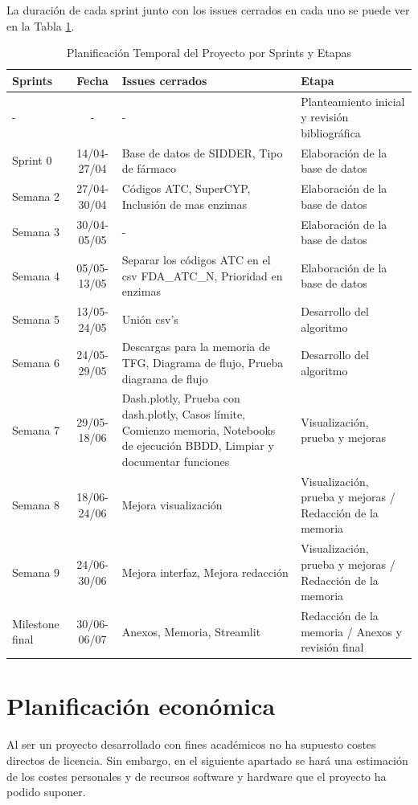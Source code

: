 La duración de cada sprint junto con los issues cerrados en cada uno se puede ver en la Tabla \ref{tab:milestones}.
\begin{table}[htbp]
\centering
\caption{Planificación Temporal del Proyecto por Sprints y Etapas}
\label{tab:milestones}
\begin{tabular}{l c p{6cm} p{4.5cm} }
\toprule
\textbf{Sprints} & \textbf{Fecha} & \textbf{Issues cerrados} & \textbf{Etapa} \\ 
\midrule
- & - & - & Planteamiento inicial y revisión bibliográfica \\
Sprint 0 & 14/04-27/04 & Base de datos de SIDDER, Tipo de fármaco & Elaboración de la base de datos \\ 
Semana 2 & 27/04-30/04 & Códigos ATC, SuperCYP, Inclusión de mas enzimas & Elaboración de la base de datos \\
Semana 3 & 30/04-05/05 & - & Elaboración de la base de datos \\
Semana 4 & 05/05-13/05 & Separar los códigos ATC en el csv FDA\_ATC\_N, Prioridad en enzimas & Elaboración de la base de datos \\
Semana 5 & 13/05-24/05 & Unión csv's & Desarrollo del algoritmo \\ 
Semana 6 & 24/05-29/05 & Descargas para la memoria de TFG, Diagrama de flujo, Prueba diagrama de flujo & Desarrollo del algoritmo \\ 
Semana 7 & 29/05-18/06 & Dash.plotly, Prueba con dash.plotly, Casos límite, Comienzo memoria, Notebooks de ejecución BBDD, Limpiar y documentar funciones & Visualización, prueba y mejoras \\
Semana 8 & 18/06-24/06 & Mejora visualización & Visualización, prueba y mejoras / Redacción de la memoria \\ 
Semana 9 & 24/06-30/06 & Mejora interfaz, Mejora redacción & Visualización, prueba y mejoras / Redacción de la memoria \\ 
Milestone final & 30/06-06/07 & Anexos, Memoria, Streamlit & Redacción de la memoria / Anexos y revisión final \\ 
\bottomrule
\end{tabular}
\end{table}

\section{Planificación económica}
Al ser un proyecto desarrollado con fines académicos no ha supuesto costes directos de licencia. Sin embargo, en el siguiente apartado se hará una estimación de los costes personales y de recursos software y hardware que el proyecto ha podido suponer.

